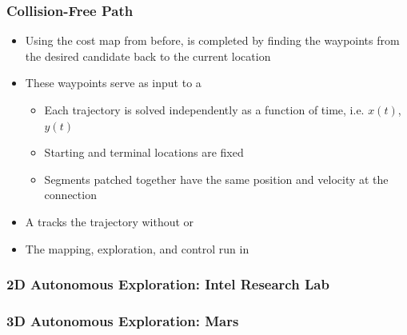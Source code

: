 \documentclass[11pt,professionalfonts,hyperref={pdftex,pdfpagemode=none,pdfstartview=FitH}]{beamer}
\renewcommand{\emph}[1]{\textit{\textbf{\color{blue}{#1}}}}
\begin{document}
\begin{frame}
\frametitle{Collision-Free Path}

\begin{itemize}
	\item Using the cost map from before, \emph{Dijkstra's algorithm} is completed by finding the waypoints from the desired candidate back to the current location
	\vspace*{0.0cm}\pause
	\item These waypoints serve as input to a \emph{constrained polynomial least squares trajectory}
	\begin{itemize}
		\item Each trajectory is solved independently as a function of time, i.e. $x(t)$, $y(t)$
		\item Starting and terminal locations are fixed
		\item Segments patched together have the same position and velocity at the connection
	\end{itemize}
	\vspace*{0.0cm}\pause
	\item A \emph{geometric controller} tracks the trajectory without \emph{singularities} or \emph{ambiguities}
	\vspace*{0.0cm}\pause
	\item The mapping, exploration, and control run in \emph{real-time}
\end{itemize}

\end{frame}

\begin{frame}
	\frametitle{2D Autonomous Exploration: Intel Research Lab}
\end{frame}

\begin{frame}
	\frametitle{3D Autonomous Exploration: Mars}
\end{frame}
\end{document}
